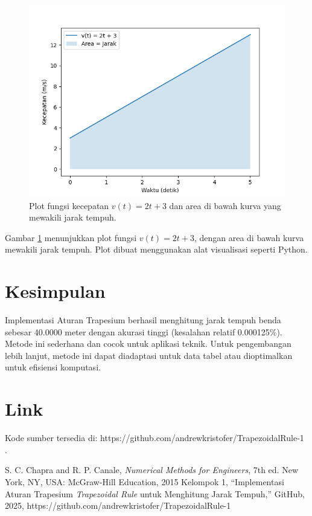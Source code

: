 \documentclass[conference]{IEEEtran}
\begin{document}
\begin{figure}[htbp]
\centerline{\includegraphics[width=1.01\linewidth]{images/velocity_plot.png}}
\caption{Plot fungsi kecepatan \( v(t) = 2t + 3 \) dan area di bawah kurva yang mewakili jarak tempuh.}
\label{fig:velocity}
\end{figure}

Gambar \ref{fig:velocity} menunjukkan plot fungsi \( v(t) = 2t + 3 \), dengan area di bawah kurva mewakili jarak tempuh. Plot dibuat menggunakan alat visualisasi seperti Python.

\section{Kesimpulan}
Implementasi Aturan Trapesium berhasil menghitung jarak tempuh benda sebesar 40.0000 meter dengan akurasi tinggi (kesalahan relatif 0.000125\%). Metode ini sederhana dan cocok untuk aplikasi teknik. Untuk pengembangan lebih lanjut, metode ini dapat diadaptasi untuk data tabel atau dioptimalkan untuk efisiensi komputasi.

\section{Link}
Kode sumber tersedia di: https://github.com/andrewkristofer/TrapezoidalRule-1 \cite{b2}.

\begin{thebibliography}{00}
 S. C. Chapra and R. P. Canale, \textit{Numerical Methods for Engineers}, 7th ed. New York, NY, USA: McGraw-Hill Education, 2015
 Kelompok 1, ``Implementasi Aturan Trapesium \textit{Trapezoidal Rule} untuk Menghitung Jarak Tempuh,'' GitHub, 2025, https://github.com/andrewkristofer/TrapezoidalRule-1
\end{thebibliography}
\end{document}
